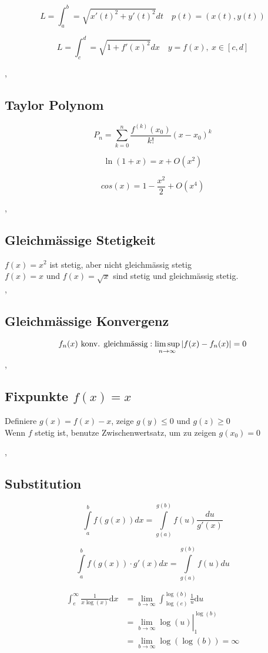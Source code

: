 \[ L = \int_a^b = \sqrt{x'(t)^2 + y'(t)^2} dt  \quad p(t) = (x(t), y(t))\]

\[ L = \int_c^d = \sqrt{1 + f'(x)^2} dx \quad y = f(x), \ x \in [c, d] \]

\sep
\subsection{Taylor Polynom}


\[
P_{n} = \sum_{k = 0}^{n} \frac{f^{(k)} (x_0)}{k!} (x - x_0)^k 
\]

\[\ln(1 + x ) = x + O(x^2) \]

\[cos(x) = 1 - \frac{x^2}{2} + O(x^4) \]

\sep
\subsection{Gleichmässige Stetigkeit}

$f(x) = x^2$ ist stetig, aber nicht gleichmässig stetig \\
$f(x) = x$ und $f(x) = \sqrt{x}$ sind stetig und gleichmässig stetig.  \\


\sep
\subsection{Gleichmässige Konvergenz}
\[f_n(x) \text{ konv. gleichmässig}: \limsup \limits_{n \rightarrow \infty} \left\lvert f(x) - f_n(x) \right\rvert = 0 \]
\sep
\subsection{Fixpunkte $f(x) = x$} 

Definiere $g(x) = f(x) - x$, zeige $g(y) \leq 0$ und $g(z) \geq 0$ \\
Wenn $f$ stetig ist, benutze Zwischenwertsatz, um zu zeigen $g(x_0) = 0$

\sep
\subsection{Substitution}

\[ \int \limits_{a}^{b} f(g(x)) dx = \int \limits_{g(a)}^{g(b)} f(u) \frac{du}{g'(x)}\]

\[ \int \limits_{a}^{b} f(g(x)) \cdot g'(x) dx = \int \limits_{g(a)}^{g(b)} f(u) du \]

\begin{equation}\begin{aligned}
\int_{e}^{\infty} \frac{1}{x \log (x)} \mathrm{d} x &=\lim _{b \rightarrow \infty} \int_{\log (e)}^{\log (b)} \frac{1}{u} \mathrm{d} u \\
&=\left.\lim _{b \rightarrow \infty} \log (u)\right|_{1} ^{\log (b)} \\
&=\lim _{b \rightarrow \infty} \log (\log (b))=\infty \nonumber
\end{aligned}\end{equation}